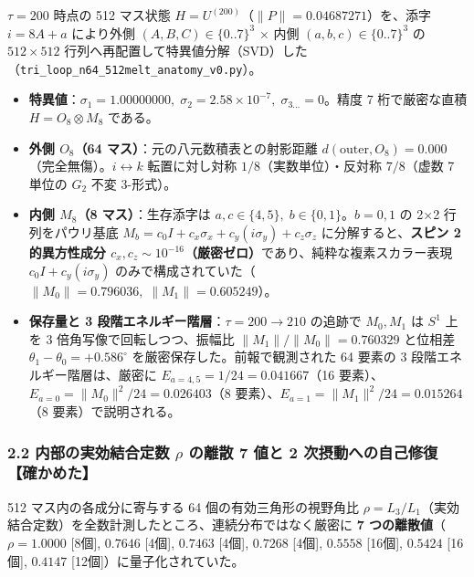\documentclass[
  a4paper,
]{ltjsarticle}
\providecommand{\tightlist}{%
  \setlength{\itemsep}{0pt}\setlength{\parskip}{0pt}}
\begin{document}
\(\tau = 200\) 時点の 512 マス状態
\(H = U^{(200)}\)（\(\|P\| = 0.04687271\)）を、添字 \(i = 8A + a\)
により外側 \((A, B, C) \in \{0..7\}^3\) × 内側
\((a, b, c) \in \{0..7\}^3\) の \(512\times 512\)
行列へ再配置して特異値分解（SVD）した（\texttt{tri\_\allowbreak{}loop\_\allowbreak{}n64\_\allowbreak{}512melt\_\allowbreak{}anatomy\_\allowbreak{}v0.py}）。

\begin{itemize}
\tightlist
\item
  \textbf{特異値}：\(\sigma_1 = 1.00000000,\; \sigma_2 = 2.58 \times 10^{-7},\; \sigma_{3\dots} = 0\)。精度
  7 桁で厳密な直積 \(H = O_8 \otimes M_8\) である。
\item
  \textbf{外側 \(O_8\)（64 マス）}：元の八元数積表との射影距離
  \(d(\text{outer}, O_8) = 0.000\)（完全無傷）。\(i \leftrightarrow k\)
  転置に対し対称 \(1/8\)（実数単位）・反対称 \(7/8\)（虚数 7 単位の
  \(G_2\) 不変 3-形式）。
\item
  \textbf{内側 \(M_8\)（8 マス）}：生存添字は
  \(a, c \in \{4, 5\},\; b \in \{0, 1\}\)。\(b=0, 1\) の 2×2
  行列をパウリ基底
  \(M_b = c_0 I + c_x \sigma_x + c_y (i\sigma_y) + c_z \sigma_z\)
  に分解すると、\textbf{スピン 2 的異方性成分
  \(c_x, c_z \sim 10^{-16}\)（厳密ゼロ）}であり、純粋な複素スカラー表現
  \(c_0 I + c_y(i\sigma_y)\)
  のみで構成されていた（\(\|M_0\| = 0.796036,\; \|M_1\| = 0.605249\)）。
\item
  \textbf{保存量と 3 段階エネルギー階層}：\(\tau = 200 \to 210\)
  の追跡で \(M_0, M_1\) は \(S^1\) 上を 3 倍角写像で回転しつつ、振幅比
  \(\|M_1\|/\|M_0\| = 0.760329\) と位相差
  \(\theta_1 - \theta_0 = +0.586^\circ\)
  を厳密保存した。前報で観測された 64 要素の 3
  段階エネルギー階層は、厳密に \(E_{a=4,5} = 1/24 = 0.041667\)（16
  要素）、\(E_{a=0} = \|M_0\|^2/24 = 0.026403\)（8
  要素）、\(E_{a=1} = \|M_1\|^2/24 = 0.015264\)（8 要素）で説明される。
\end{itemize}

\subsubsection{\texorpdfstring{2.2 内部の実効結合定数 \(\rho\) の離散 7
値と 2
次摂動への自己修復【確かめた】}{2.2 内部の実効結合定数 \textbackslash rho の離散 7 値と 2 次摂動への自己修復【確かめた】}}\label{ux5185ux90e8ux306eux5b9fux52b9ux7d50ux5408ux5b9aux6570-rho-ux306eux96e2ux6563-7-ux5024ux3068-2-ux6b21ux6442ux52d5ux3078ux306eux81eaux5df1ux4feeux5fa9ux78baux304bux3081ux305f}

512 マス内の各成分に寄与する 64 個の有効三角形の視野角比
\(\rho = L_3/L_1\)（実効結合定数）を全数計測したところ、連続分布ではなく厳密に
\textbf{7 つの離散値}（\(\rho = 1.0000\) {[}8個{]}, \(0.7646\)
{[}4個{]}, \(0.7463\) {[}4個{]}, \(0.7268\) {[}4個{]}, \(0.5558\)
{[}16個{]}, \(0.5424\) {[}16個{]}, \(0.4147\)
{[}12個{]}）に量子化されていた。
\end{document}
